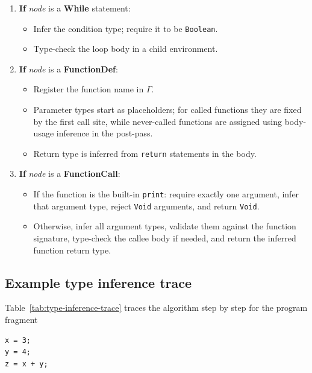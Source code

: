 \begin{enumerate}[leftmargin=1.5em, label=\arabic*., itemsep=2pt]
  \item \textbf{If} \textit{node} is a \textbf{While} statement:
        \begin{itemize}[nosep, leftmargin=1.5em]
          \item Infer the condition type; require it to be \texttt{Boolean}.
          \item Type-check the loop body in a child environment.
        \end{itemize}

  \item \textbf{If} \textit{node} is a \textbf{FunctionDef}:
        \begin{itemize}[nosep, leftmargin=1.5em]
          \item Register the function name in $\Gamma$.
          \item Parameter types start as placeholders; for called functions they
                are fixed by the first call site, while never-called functions
                are assigned using body-usage inference in the post-pass.
          \item Return type is inferred from \texttt{return} statements in the body.
        \end{itemize}

  \item \textbf{If} \textit{node} is a \textbf{FunctionCall}:
        \begin{itemize}[nosep, leftmargin=1.5em]
          \item If the function is the built-in \texttt{print}:\quad
          require exactly one argument, infer that argument type,
          reject \texttt{Void} arguments, and return \texttt{Void}.
          \item Otherwise, infer all argument types, validate them against the
                function signature, type-check the callee body if needed, and
                return the inferred function return type.
        \end{itemize}
\end{enumerate}

\subsection{Example type inference trace}
Table~\ref{tab:type-inference-trace} traces the algorithm step by step for
the program fragment

\begin{lstlisting}
x = 3;
y = 4;
z = x + y;
\end{lstlisting}


